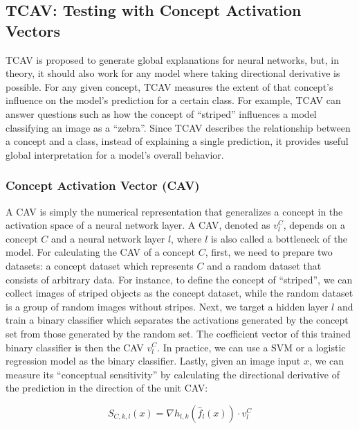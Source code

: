 \documentclass[
  11pt,
]{scrbook}
\begin{document}
\hypertarget{tcav-testing-with-concept-activation-vectors}{%
\subsection{TCAV: Testing with Concept Activation Vectors}\label{tcav-testing-with-concept-activation-vectors}}

TCAV is proposed to generate global explanations for neural networks, but, in theory, it should also work for any model where taking directional derivative is possible.
For any given concept, TCAV measures the extent of that concept's influence on the model's prediction for a certain class.
For example, TCAV can answer questions such as how the concept of ``striped'' influences a model classifying an image as a ``zebra''.
Since TCAV describes the relationship between a concept and a class, instead of explaining a single prediction, it provides useful global interpretation for a model's overall behavior.

\hypertarget{concept-activation-vector-cav}{%
\subsubsection{Concept Activation Vector (CAV)}\label{concept-activation-vector-cav}}

A CAV is simply the numerical representation that generalizes a concept in the activation space of a neural network layer.
A CAV, denoted as \(v_l^C\), depends on a concept \(C\) and a neural network layer \(l\), where \(l\) is also called a bottleneck of the model.
For calculating the CAV of a concept \(C\), first, we need to prepare two datasets: a concept dataset which represents \(C\) and a random dataset that consists of arbitrary data.
For instance, to define the concept of ``striped'', we can collect images of striped objects as the concept dataset, while the random dataset is a group of random images without stripes.
Next, we target a hidden layer \(l\) and train a binary classifier which separates the activations generated by the concept set from those generated by the random set.
The coefficient vector of this trained binary classifier is then the CAV \(v_l^C\).
In practice, we can use a SVM or a logistic regression model as the binary classifier.
Lastly, given an image input \(x\), we can measure its ``conceptual sensitivity'' by calculating the directional derivative of the prediction in the direction of the unit CAV:

\[S_{C,k,l}(x)=\nabla h_{l,k}(\hat{f}_l(x))\cdot v_l^C\]
\end{document}
